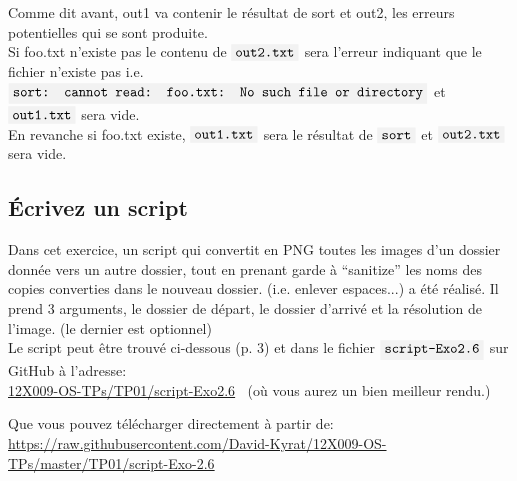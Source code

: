 \documentclass[french]{article}
\newcommand{\code}[1]{$\mbox{\colorbox{light-gray}{\texttt{#1}}}$}
\newcommand{\quo}[1]{``{#1}''}
\begin{document}
\begin{enumerate}[label=(\alph*)]
Comme dit avant, out1 va contenir le résultat de sort et out2, les erreurs potentielles qui se sont produite.\\
Si foo.txt n'existe pas le contenu de \code{out2.txt} sera l'erreur indiquant que le fichier n'existe pas i.e. \code{sort: cannot read: foo.txt: No such file or directory} et \code{out1.txt} sera vide.\\
En revanche si foo.txt existe, \code{out1.txt} sera le résultat de \code{sort} et \code{out2.txt} sera vide.
\end{enumerate}

\subsection{Écrivez un script}
Dans cet exercice, un script qui convertit en PNG toutes les images d'un dossier donnée vers un autre dossier, tout en prenant garde à \quo{sanitize} les noms des copies converties dans le nouveau dossier. (i.e. enlever espaces...)  a été réalisé. Il prend 3 arguments, le dossier de départ, le dossier d'arrivé et la résolution de l'image. (le dernier est optionnel)\\

Le script peut être trouvé ci-dessous (p. 3) et dans le fichier \code{script-Exo2.6} sur GitHub à l'adresse:\\
 \href{https://github.com/David-Kyrat/12X009-OS-TPs/blob/master/TP01/script-Exo-2.6}{12X009-OS-TPs/TP01/script-Exo2.6} $\ $ (où vous aurez un bien meilleur rendu.)\vspace{0.15cm}
 
 Que vous pouvez télécharger directement à partir de: \\ \url{https://raw.githubusercontent.com/David-Kyrat/12X009-OS-TPs/master/TP01/script-Exo-2.6}\\
\newpage
\end{document}
